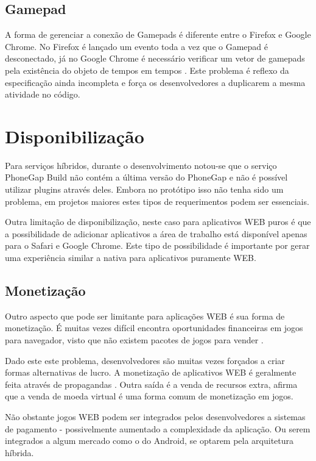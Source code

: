 \subsection{Gamepad}

A forma de gerenciar a conexão de Gamepads é diferente entre o Firefox
e Google Chrome. No Firefox é lançado um evento toda a vez que o
Gamepad é desconectado, já no Google Chrome é necessário verificar
um vetor de gamepads pela existência do objeto de tempos em tempos \autocite{gamepad}.
Este problema é reflexo da especificação ainda incompleta e força os
desenvolvedores a duplicarem a mesma atividade no código.

\section{Disponibilização}

Para serviços híbridos, durante o desenvolvimento notou-se que o
serviço PhoneGap Build não contém a última versão do PhoneGap e
não é possível utilizar plugins através deles. Embora no protótipo
isso não tenha sido um problema, em projetos maiores estes tipos de
requerimentos podem ser essenciais.

Outra limitação de disponibilização, neste caso para aplicativos
WEB puros é que a possibilidade de adicionar aplicativos a área de
trabalho está disponível apenas para o Safari e Google Chrome. Este
tipo de possibilidade é importante por gerar uma experiência similar a
nativa para aplicativos puramente WEB.

\subsection{Monetização}

Outro aspecto que pode ser limitante para aplicações WEB é sua forma
de monetização. É muitas vezes difícil encontra oportunidades
financeiras em jogos para navegador, visto que não existem pacotes de
jogos para vender \autocite[pp. 44]{gameCommunities}.

Dado este este problema, desenvolvedores são muitas vezes forçados
a criar formas alternativas de lucro. A monetização de aplicativos
WEB é geralmente feita através de propagandas \autocite[pp.
44]{gameCommunities}. Outra saída é a venda de recursos extra,
\cite[pp. 44]{gameCommunities} afirma que a venda de moeda virtual é
uma forma comum de monetização em jogos.

Não obstante jogos WEB podem ser integrados pelos desenvolvedores
a sistemas de pagamento - possivelmente aumentado a complexidade da
aplicação. Ou serem integrados a algum mercado como o do Android, se
optarem pela arquitetura híbrida.

